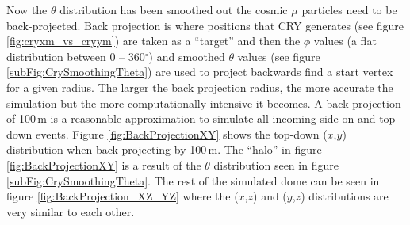Now the $\theta$ distribution has been smoothed out the cosmic $\mu$ particles need to be back-projected. Back projection is where positions that CRY generates (see figure \ref{fig:cryxm_vs_cryym}) are taken as a ``target'' and then the $\phi$ values (a flat distribution between 0 -- 360$^\circ$) and smoothed $\theta$ values (see figure \ref{subFig:CrySmoothingTheta}) are used to project backwards find a start vertex for a given radius. The larger the back projection radius, the more accurate the simulation but the more computationally intensive it becomes. A back-projection of 100\,m is a reasonable approximation to simulate all incoming side-on and top-down events. Figure \ref{fig:BackProjectionXY} shows the top-down ($x$,$y$) distribution when back projecting by 100\,m. The ``halo'' in figure \ref{fig:BackProjectionXY} is a result of the $\theta$ distribution seen in figure \ref{subFig:CrySmoothingTheta}. The rest of the simulated dome can be seen in figure \ref{fig:BackProjection_XZ_YZ} where the ($x$,$z$) and ($y$,$z$) distributions are very similar to each other. 


